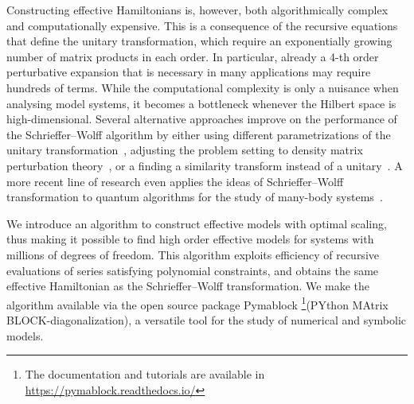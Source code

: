 Constructing effective Hamiltonians is, however, both algorithmically
complex and computationally expensive.
This is a consequence of the recursive equations that define the unitary
transformation, which require an exponentially growing number of matrix products
in each order.
In particular, already a 4-th order perturbative expansion that is necessary in
many applications may require hundreds of terms.
While the computational complexity is only a nuisance when analysing model
systems, it becomes a bottleneck whenever the Hilbert space is
high-dimensional.
Several alternative approaches improve on the performance of the
Schrieffer--Wolff algorithm by either using different parametrizations of the
unitary transformation~\cite{Van_Vleck_1929, Shavitt_1980, Lowdin_1962, Klein_1974,
Suzuki_1983}, adjusting the problem setting to density matrix perturbation
theory~\cite{McWeeny_1962, Truflandier_2020}, or a finding a similarity
transform instead of a unitary~\cite{Bloch_1958}.
A more recent line of research even applies the ideas of Schrieffer--Wolff
transformation to quantum algorithms for the study of many-body
systems~\cite{Wurtz_2020, Zhang_2022}.

We introduce an algorithm to construct effective models with optimal scaling,
thus making it possible to find high order effective models for systems with
millions of degrees of freedom.
This algorithm exploits efficiency of recursive evaluations of series
satisfying polynomial constraints, and obtains the same effective Hamiltonian
as the Schrieffer--Wolff transformation.
We make the algorithm available via the open source package Pymablock
\footnote{The documentation and tutorials are available in
\url{https://pymablock.readthedocs.io/}}(PYthon MAtrix
BLOCK-diagonalization), a versatile tool for the study of numerical and
symbolic models.
